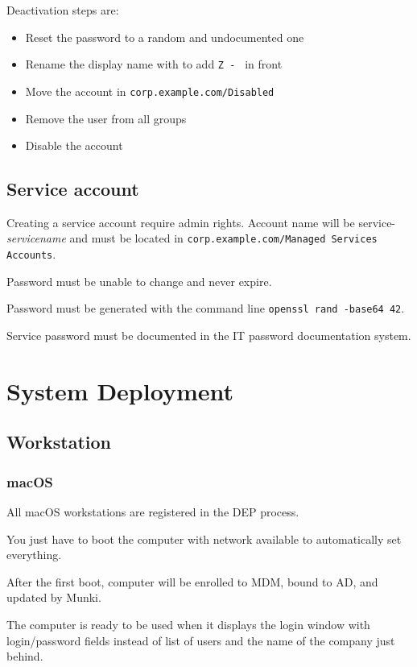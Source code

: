 \documentclass{demo}
\begin{document}
Deactivation steps are:
\begin{itemize}
  \item Reset the password to a random and undocumented one
  \item Rename the display name with to add \texttt{Z - } in front
  \item Move the account in \texttt{corp.example.com/Disabled}
  \item Remove the user from all groups
  \item Disable the account
\end{itemize}

\subsection{Service account}

Creating a service account require admin rights. Account name will be service-\textit{servicename} and must be located in \texttt{corp.example.com/Managed Services Accounts}.

Password must be unable to change and never expire.

Password must be generated with the command line \texttt{openssl rand -base64 42}.

Service password must be documented in the IT password documentation system.

\section{System Deployment}

\subsection{Workstation}

\subsubsection{macOS}

All macOS workstations are registered in the DEP process.

You just have to boot the computer with network available to automatically set everything.

After the first boot, computer will be enrolled to MDM, bound to AD, and updated by Munki.

The computer is ready to be used when it displays the login window with login/password fields instead of list of users and the name of the company just behind.
\end{document}
